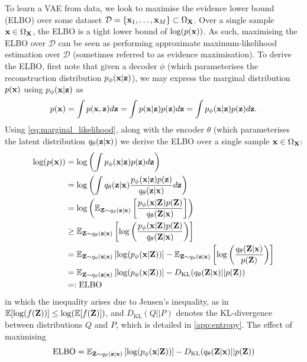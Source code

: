 \documentclass[11pt]{article}
\begin{document}
To learn a VAE from data, we look to maximise the evidence lower bound (ELBO) over some dataset $\mathcal{D}=\{\mathbf{x}_1,\dots,\mathbf{x}_M\}\subset\Omega_{\mathbf{X}}$. Over a single sample $\mathbf{x}\in\Omega_{\mathbf{X}}$, the ELBO is a tight lower bound of $\log(p(\mathbf{x}))$. As such, maximising the ELBO over $\mathcal{D}$ can be seen as performing approximate maximum-likelihood estimation over $\mathcal{D}$ (sometimes referred to as evidence maximisation). To derive the ELBO, first note that given a decoder $\phi$ (which parameterises the reconstruction distribution $p_{\phi}(\mathbf{x}|\mathbf{z})$), we may express the marginal distribution $p(\mathbf{x})$ using $p_{\phi}(\mathbf{x}|\mathbf{z})$ as
\begin{equation}
\label{eq:marginal_likelihood}
p(\mathbf{x})
=
\int p(\mathbf{x},\mathbf{z})d\mathbf{z}
=
\int p(\mathbf{x}|\mathbf{z})p(\mathbf{z})d\mathbf{z}
=
\int p_{\phi}(\mathbf{x}|\mathbf{z})p(\mathbf{z})d\mathbf{z}.
\end{equation}
Using \autoref{eq:marginal_likelihood}, along with the encoder $\theta$ (which parameterises the latent distribution $q_{\theta}(\mathbf{z}|\mathbf{x})$) we derive the ELBO over a single sample $\mathbf{x}\in\Omega_{\mathbf{X}}$:
\begin{align*}
    \log(p(\mathbf{x}))
    &=
    \log\left(\int p_{\phi}(\mathbf{x}|\mathbf{z})p(\mathbf{z})d\mathbf{z}\right)\\
    &=
    \log\left(\int q_{\theta}(\mathbf{z}|\mathbf{x})\frac{p_{\phi}(\mathbf{x}|\mathbf{z})p(\mathbf{z})}{q_{\theta}(\mathbf{z}|\mathbf{x})}d\mathbf{z}\right)\\
    &=
    \log\left(\mathbb{E}_{\mathbf{Z}\sim q_{\theta}(\mathbf{z}|\mathbf{x})}\left[\frac{p_{\phi}(\mathbf{x}|\mathbf{Z})p(\mathbf{Z})}{q_{\theta}(\mathbf{Z}|\mathbf{x})}\right]\right)\\
    &\geq
    \mathbb{E}_{\mathbf{Z}\sim q_{\theta}(\mathbf{z}|\mathbf{x})}\left[\log\left(\frac{p_{\phi}(\mathbf{x}|\mathbf{Z})p(\mathbf{Z})}{q_{\theta}(\mathbf{Z}|\mathbf{x})}\right)\right]\\
    &=
    \mathbb{E}_{\mathbf{Z}\sim q_{\theta}(\mathbf{z}|\mathbf{x})}\left[\log(p_{\phi}(\mathbf{x}|\mathbf{Z}))\right]-\mathbb{E}_{\mathbf{Z}\sim q_{\theta}(\mathbf{z}|\mathbf{x})}\left[\log\left(\frac{q_{\theta}(\mathbf{Z}|\mathbf{x})}{p(\mathbf{Z})}\right)\right]\\
    &=
    \mathbb{E}_{\mathbf{Z}\sim q_{\theta}(\mathbf{z}|\mathbf{x})}\left[\log(p_{\phi}(\mathbf{x}|\mathbf{Z}))\right]-D_{\text{KL}}(q_{\theta}(\mathbf{Z}|\mathbf{x})||p(\mathbf{Z}))\\
    &=:
    \text{ELBO}
\end{align*}
in which the inequality arises due to Jensen's inequality, as in $\mathbb{E}[\log(f(\mathbf{Z}))]\leq\log(\mathbb{E}[f(\mathbf{Z})])$, and $D_\text{KL}(Q||P)$ denotes the KL-divergence between distributions $Q$ and $P$, which is detailed in \autoref{app:entropy}. The effect of maximising
$$
\text{ELBO}
=
\mathbb{E}_{\mathbf{Z}\sim q_{\theta}(\mathbf{z}|\mathbf{x})}\left[\log(p_{\phi}(\mathbf{x}|\mathbf{Z}))\right]-D_{\text{KL}}(q_{\theta}(\mathbf{Z}|\mathbf{x})||p(\mathbf{Z}))
$$
\end{document}
